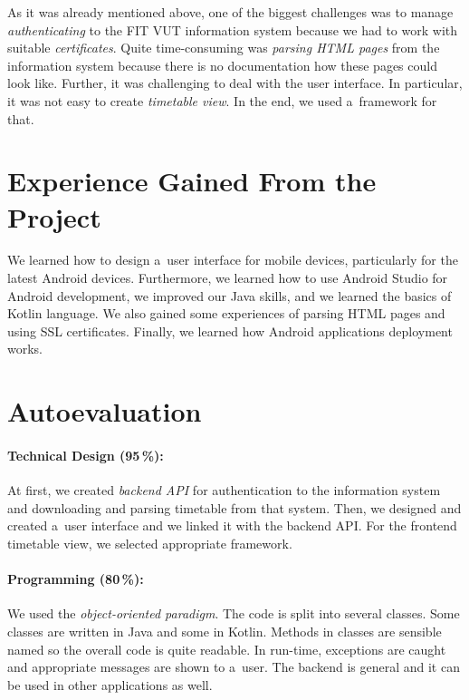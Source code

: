 \documentclass[12pt, a4paper, titlepage, final]{article}
\begin{document}
As it was already mentioned above, one of the biggest challenges was to manage
\emph{authenticating} to the FIT VUT information system because we had to work
with suitable \emph{certificates}. Quite time-consuming was \emph{parsing HTML
pages} from the information system because there is no documentation how these
pages could look like. Further, it was challenging to deal with the user
interface. In particular, it was not easy to create \emph{timetable view}. In
the end, we used a~framework for that.


\section*{Experience Gained From the Project}

We learned how to design a~user interface for mobile devices, particularly
for the latest Android devices. Furthermore, we learned how to use Android
Studio for Android development, we improved our Java skills, and we
learned the basics of Kotlin language. We also gained some experiences of
parsing HTML pages and using SSL certificates. Finally, we learned how
Android applications deployment works.


\section*{Autoevaluation}

\paragraph{Technical Design (95\,\%):}
At first, we created \emph{backend API} for authentication to the information
system and downloading and parsing timetable from that system. Then,
we designed and created a~user interface and we linked it with the backend
API. For the frontend timetable view, we selected appropriate framework.

\paragraph{Programming (80\,\%):}
We used the \emph{object-oriented paradigm}. The code is split into several
classes. Some classes are written in Java and some in Kotlin. Methods in
classes are sensible named so the overall code is quite readable. In run-time,
exceptions are caught and appropriate messages are shown to a~user.
The backend is general and it can be used in other applications as well.
\end{document}
